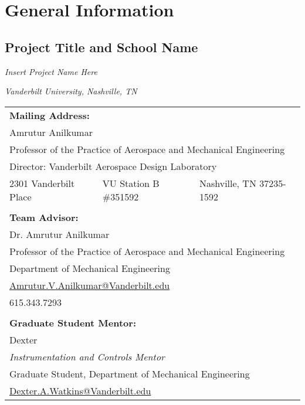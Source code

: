 \documentclass[class=article, crop=false]{standalone}
\begin{document}
	\section{General Information}
	\subsection{Project Title and School Name}
	\bigbreak
		
		\centerline{\textit{Insert Project Name Here}} \bigbreak
		\centerline{\textit{Vanderbilt University, Nashville, TN}} \smallbreak
		\bigbreak

		\FloatBarrier		
		\begin{table*} [h]
			\centering
			\begin{adjustbox}{max width=0.89\textwidth}
			\begin{tabular}{lll}
				\multicolumn{3}{l}{\textbf{Mailing Address:}}\\
				\multicolumn{3}{l}{Amrutur Anilkumar} \\
				\multicolumn{3}{l}{Professor of the Practice of Aerospace and Mechanical Engineering} \\
				\multicolumn{3}{l}{Director: Vanderbilt Aerospace Design Laboratory} \\
				\multicolumn{1}{L{0.3\linewidth}}{2301 Vanderbilt Place} & \multicolumn{1}{C{0.3\linewidth}}{VU Station B \#351592} & \multicolumn{1}{R{0.3\linewidth}}{Nashville, TN 37235-1592}\\
				& & \\
				\multicolumn{3}{l}{\textbf{Team Advisor:}} \\
				\multicolumn{3}{l}{Dr. Amrutur Anilkumar} \\
				\multicolumn{3}{l}{Professor of the Practice of Aerospace and Mechanical Engineering} \\
				\multicolumn{3}{l}{Department of Mechanical Engineering} \\
				\multicolumn{3}{l}{\href{mailto:Amrutur.V.Anilkumar@Vanderbilt.edu}{Amrutur.V.Anilkumar@Vanderbilt.edu}} \\
				\multicolumn{3}{l}{615.343.7293} \\
				& & \\
				
				\multicolumn{3}{l}{\textbf{Graduate Student Mentor:}} \\
				\multicolumn{3}{l}{Dexter} \\
				\multicolumn{3}{l}{\textit{Instrumentation and Controls Mentor}} \\
				\multicolumn{3}{l}{Graduate Student, Department of Mechanical Engineering} \\
				\multicolumn{3}{l}{\href{mailto:Dexter.A.Watkins@Vanderbilt.edu}{Dexter.A.Watkins@Vanderbilt.edu}} \\
				
			\end{tabular}
			\end{adjustbox}
		\end{table*}
	\FloatBarrier
\end{document}
